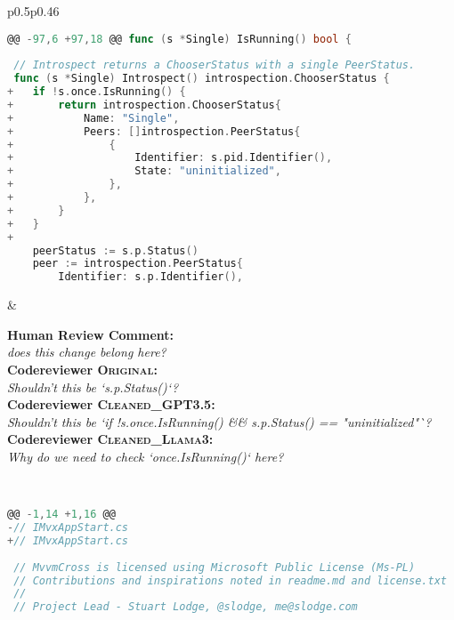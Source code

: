\begin{figure*}[!th]
\centering
\small
\begin{tabular}[t]{p{0.5\textwidth}p{0.46\textwidth}}
\begin{lstlisting}[style=mystyle, language=Go, basicstyle=\scriptsize]
@@ -97,6 +97,18 @@ func (s *Single) IsRunning() bool {
 
 // Introspect returns a ChooserStatus with a single PeerStatus.
 func (s *Single) Introspect() introspection.ChooserStatus {
+   if !s.once.IsRunning() {
+       return introspection.ChooserStatus{
+           Name: "Single",
+           Peers: []introspection.PeerStatus{
+               {
+                   Identifier: s.pid.Identifier(),
+                   State: "uninitialized",
+               },
+           },
+       }
+   }
+
    peerStatus := s.p.Status()
    peer := introspection.PeerStatus{
        Identifier: s.p.Identifier(),
\end{lstlisting}
& \raisebox{-2.5\height} {\begin{minipage}[t]{\linewidth}
\textbf{Human Review Comment: \\} \textit{does this change belong here?} \\[0.5em]
\textbf{Codereviewer \textsc{Original}:\\} \textit{Shouldn't this be `s.p.Status()`?}   \\[0.5em]
\textbf{Codereviewer \textsc{Cleaned\_GPT3.5}:\\} \textit{Shouldn't this be `if !s.once.IsRunning() \&\& s.p.Status() == "uninitialized"`?} \\[0.5em]
\textbf{Codereviewer \textsc{Cleaned\_Llama3}:\\} \textit{Why do we need to check `once.IsRunning()` here?}
\end{minipage}} \\ [-2em] %
\begin{lstlisting}[style=mystyle, language=Go, basicstyle=\scriptsize]
@@ -1,14 +1,16 @@
-// IMvxAppStart.cs
+// IMvxAppStart.cs
 
 // MvvmCross is licensed using Microsoft Public License (Ms-PL)
 // Contributions and inspirations noted in readme.md and license.txt
 //
 // Project Lead - Stuart Lodge, @slodge, me@slodge.com
 

\end{lstlisting}
\end{tabular}
\end{figure*}
